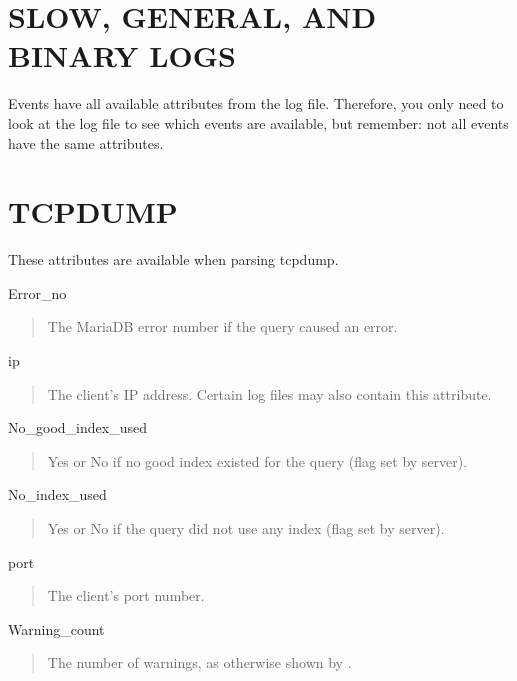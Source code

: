 \documentclass[letterpaper,10pt,english]{sphinxmanual}
\begin{document}
\section{SLOW, GENERAL, AND BINARY LOGS}
\label{\detokenize{mariadb-query-digest:slow-general-and-binary-logs}}
\sphinxAtStartPar
Events have all available attributes from the log file.  Therefore, you only
need to look at the log file to see which events are available, but remember:
not all events have the same attributes.


\section{TCPDUMP}
\label{\detokenize{mariadb-query-digest:tcpdump}}
\sphinxAtStartPar
These attributes are available when parsing {\hyperref[\detokenize{mariadb-query-digest:cmdoption-mariadb-query-digest-type}]{}} tcpdump.

\sphinxAtStartPar
Error\_no
\begin{quote}

\sphinxAtStartPar
The MariaDB error number if the query caused an error.
\end{quote}

\sphinxAtStartPar
ip
\begin{quote}

\sphinxAtStartPar
The client’s IP address.  Certain log files may also contain this attribute.
\end{quote}

\sphinxAtStartPar
No\_good\_index\_used
\begin{quote}

\sphinxAtStartPar
Yes or No if no good index existed for the query (flag set by server).
\end{quote}

\sphinxAtStartPar
No\_index\_used
\begin{quote}

\sphinxAtStartPar
Yes or No if the query did not use any index (flag set by server).
\end{quote}

\sphinxAtStartPar
port
\begin{quote}

\sphinxAtStartPar
The client’s port number.
\end{quote}

\sphinxAtStartPar
Warning\_count
\begin{quote}

\sphinxAtStartPar
The number of warnings, as otherwise shown by .
\end{quote}
\end{document}
